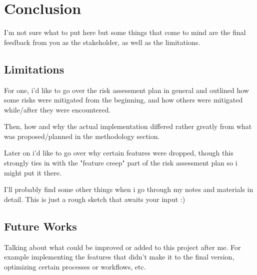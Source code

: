 \chapter{Conclusion}
\label{sec:conclusion}

I'm not sure what to put here but some things that come to mind are the final feedback from you as the stakeholder, as well as the limitations.

\section{Limitations}

For one, i'd like to go over the risk assessment plan in general and outlined how some risks were mitigated from the beginning, and how others were mitigated while/after they were encountered.

Then, how and why the actual implementation differed rather greatly from what was proposed/planned in the methodology section.

Later on i'd like to go over why certain features were dropped, though this strongly ties in with the "feature creep" part of the risk assessment plan so i might put it there.

I'll probably find some other things when i go through my notes and materials in detail. This is just a rough sketch that awaits your input :)

\section{Future Works}

Talking about what could be improved or added to this project after me.
For example implementing the features that didn't make it to the final version, optimizing certain processes or workflows, etc.